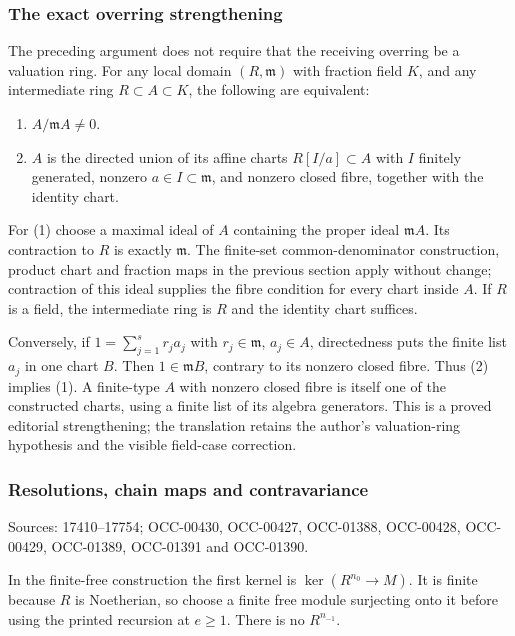 \subsubsection{The exact overring strengthening}\label{the-exact-overring-strengthening}

The preceding argument does not require that the receiving overring be a valuation ring. For any local domain \((R,\mathfrak m)\) with fraction field \(K\), and any intermediate ring \(R\subset A\subset K\), the following are equivalent:

\begin{enumerate}
\def\labelenumi{\arabic{enumi}.}
\tightlist
\item
  \(A/\mathfrak mA\ne0\).
\item
  \(A\) is the directed union of its affine charts \(R[I/a]\subset A\) with \(I\) finitely generated, nonzero \(a\in I\subset\mathfrak m\), and nonzero closed fibre, together with the identity chart.
\end{enumerate}

For (1) choose a maximal ideal of \(A\) containing the proper ideal \(\mathfrak mA\). Its contraction to \(R\) is exactly \(\mathfrak m\). The finite-set common-denominator construction, product chart and fraction maps in the previous section apply without change; contraction of this ideal supplies the fibre condition for every chart inside \(A\). If \(R\) is a field, the intermediate ring is \(R\) and the identity chart suffices.

Conversely, if \(1=\sum_{j=1}^s r_j a_j\) with \(r_j\in\mathfrak m\), \(a_j\in A\), directedness puts the finite list \(a_j\) in one chart \(B\). Then \(1\in\mathfrak mB\), contrary to its nonzero closed fibre. Thus (2) implies (1). A finite-type \(A\) with nonzero closed fibre is itself one of the constructed charts, using a finite list of its algebra generators. This is a proved editorial strengthening; the translation retains the author's valuation-ring hypothesis and the visible field-case correction.

\subsubsection{Resolutions, chain maps and contravariance}\label{resolutions-chain-maps-and-contravariance}

Sources: 17410--17754; OCC-00430, OCC-00427, OCC-01388, OCC-00428, OCC-00429, OCC-01389, OCC-01391 and OCC-01390.

In the finite-free construction the first kernel is \(\ker(R^{n_0}\to M)\). It is finite because \(R\) is Noetherian, so choose a finite free module surjecting onto it before using the printed recursion at \(e\geq1\). There is no \(R^{n_{-1}}\).

